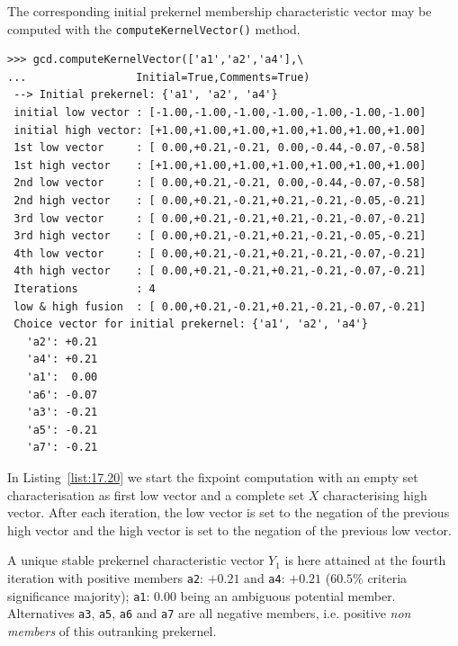 The corresponding initial prekernel membership characteristic vector may be computed with the \texttt{computeKernelVector()} method.
\begin{lstlisting}[caption={Fixpoint iterations for initial prekernel \texttt{\{a1, a2, a4\}}},label=list:17.20]
>>> gcd.computeKernelVector(['a1','a2','a4'],\
...                 Initial=True,Comments=True)
 --> Initial prekernel: {'a1', 'a2', 'a4'}
 initial low vector : [-1.00,-1.00,-1.00,-1.00,-1.00,-1.00,-1.00]
 initial high vector: [+1.00,+1.00,+1.00,+1.00,+1.00,+1.00,+1.00]
 1st low vector     : [ 0.00,+0.21,-0.21, 0.00,-0.44,-0.07,-0.58]
 1st high vector    : [+1.00,+1.00,+1.00,+1.00,+1.00,+1.00,+1.00]
 2nd low vector     : [ 0.00,+0.21,-0.21, 0.00,-0.44,-0.07,-0.58]
 2nd high vector    : [ 0.00,+0.21,-0.21,+0.21,-0.21,-0.05,-0.21]
 3rd low vector     : [ 0.00,+0.21,-0.21,+0.21,-0.21,-0.07,-0.21]
 3rd high vector    : [ 0.00,+0.21,-0.21,+0.21,-0.21,-0.05,-0.21]
 4th low vector     : [ 0.00,+0.21,-0.21,+0.21,-0.21,-0.07,-0.21]
 4th high vector    : [ 0.00,+0.21,-0.21,+0.21,-0.21,-0.07,-0.21]
 Iterations         : 4
 low & high fusion  : [ 0.00,+0.21,-0.21,+0.21,-0.21,-0.07,-0.21]
 Choice vector for initial prekernel: {'a1', 'a2', 'a4'}
   'a2': +0.21
   'a4': +0.21
   'a1':  0.00
   'a6': -0.07
   'a3': -0.21
   'a5': -0.21
   'a7': -0.21
\end{lstlisting}

In Listing~\vref{list:17.20} we start the fixpoint computation with an empty set characterisation as first low vector and a complete set $X$ characterising high vector. After each iteration, the low vector is set to the negation of the previous high vector and the high vector is set to the negation of the previous low vector.

A unique stable prekernel characteristic vector $Y_1$ is here attained at the fourth iteration with positive members \texttt{a2}: $+0.21$ and \texttt{a4}: $+0.21$ ($60.5\%$ criteria significance majority); \texttt{a1}: $0.00$ being an ambiguous potential member. Alternatives \texttt{a3}, \texttt{a5}, \texttt{a6} and \texttt{a7} are all negative members, i.e. positive \emph{non members} of this outranking prekernel.


